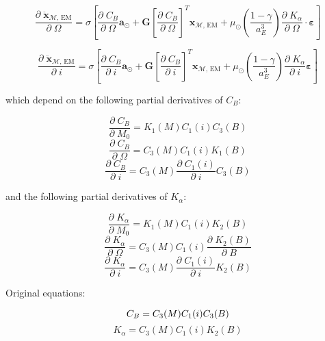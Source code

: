 \documentclass[]{article}
\newcommand{\pd}[2]{\frac{\partial\;#1}{\partial\;#2}}
\begin{document}
	\begin{equation}
		\pd{\ddot{\mathbf{x}}_{\mathcal{M}\text{, EM}}}{\Omega} = \sigma \left[ \pd{C_B}{\Omega} \mathbf{a}_{\odot} + \mathbf{G} \left[ \pd{C_B}{\Omega} \right]^T \mathbf{x}_{\mathcal{M}\text{, EM}} + \mu_\odot \left(\frac{1-\gamma}{a_E^3}\right) \pd{K_\alpha}{\Omega} \cdot \boldsymbol{\varepsilon} \right]
	\end{equation}
	
	\begin{equation}
		\pd{\ddot{\mathbf{x}}_{\mathcal{M}\text{, EM}}}{i} = \sigma \left[ \pd{C_B}{i} \mathbf{a}_{\odot} + \mathbf{G} \left[ \pd{C_B}{i} \right]^T \mathbf{x}_{\mathcal{M}\text{, EM}} + \mu_\odot \left(\frac{1-\gamma}{a_E^3}\right) \pd{K_\alpha}{i} \boldsymbol{\varepsilon} \right]
	\end{equation}
	
	which depend on the following partial derivatives of $C_B$:
	
	\begin{equation*}
		\pd{C_B}{M_0} = K_1(M) C_1(i) C_3(B)
	\end{equation*}
	\begin{equation*}
		\pd{C_B}{\Omega} = C_3(M) C_1(i) K_1(B)
	\end{equation*}
	\begin{equation*}
		\pd{C_B}{i} = C_3(M) \pd{C_1(i)}{i} C_3(B)
	\end{equation*}
	
	and the following partial derivatives of $K_\alpha$:
	
	\begin{equation*}
		\pd{K_\alpha}{M_0} = K_1(M) C_1(i) K_2(B)
	\end{equation*}
	\begin{equation*}                     
		\pd{K_\alpha}{\Omega} = C_3(M) C_1(i) \pd{K_2(B)}{B}
	\end{equation*}
	\begin{equation*}
		\pd{K_\alpha}{i} = C_3(M) \pd{C_1(i)}{i} K_2(B)
	\end{equation*}
	
	Original equations:
	
	\begin{equation}
		C_B = C_3(M) C_1(i) C_3(B) \\
	\end{equation}
	\begin{equation}
		K_\alpha = C_3(M) C_1(i) K_2(B)
	\end{equation}
	
\end{document}
